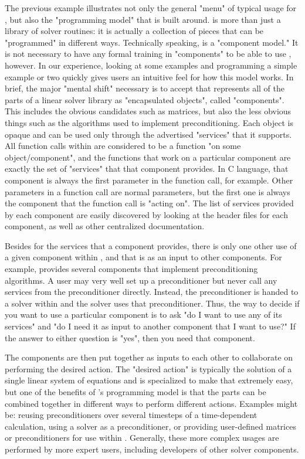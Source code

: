 The previous example illustrates not only the general "menu" of typical usage
for \hypre{}, but also the 
"programming model" that \hypre{} is built around. \hypre{} is more than just a
library of solver routines: it 
is actually a collection of pieces that can be "programmed" in different ways.
Technically speaking, 
\hypre{} is a "component model." It is not necessary to have any formal training
in "components" to be able 
to use \hypre{}, however. In our experience, looking at some examples and
programming a simple example 
or two quickly gives users an intuitive feel for how this model works. In
brief, the major "mental shift" 
necessary is to accept that \hypre{} represents all of the parts of a linear
solver library as "encapsulated 
objects", called "components". This includes the obvious candidates such as
matrices, but also the less 
obvious things such as the algorithms used to implement preconditioning. Each
object is opaque and can be 
used only through the advertised "services" that it supports. All function
calls within \hypre{} are 
considered to be a function "on some object/component", and the functions that
work on a particular 
component are exactly the set of "services" that that component provides. In C
language, that component is 
always the first parameter in the function call, for example. Other parameters
in a function call are normal 
parameters, but the first one is always the component that the function call is
"acting on". The list of 
services provided by each component are easily discovered by looking at the
header files for each 
component, as well as other centralized documentation. 

Besides for the services that a component provides, there is only one other use
of a given component within 
\hypre{}, and that is as an input to other components. For example, \hypre{} provides
several components 
that implement preconditioning algorithms. A user may very well set up a
preconditioner but never call any 
services from the preconditioner directly. Instead, the preconditioner is
handed to a solver within \hypre{} 
and the solver uses that preconditioner. Thus, the way to decide if you want to
use a particular component 
is to ask "do I want to use any of its services" and "do I need it as input to
another component that I want to 
use?" If the answer to either question is "yes", then you need that component.

The components are then put together as inputs to each other to collaborate on
performing the desired 
action. The "desired action" is typically the solution of a single linear
system of equations and \hypre{} is 
specialized to make that extremely easy, but one of the benefits of \hypre{}'s
programming model is that 
the parts can be combined together in different ways to perform different
actions. Examples might be: 
reusing preconditioners over several timesteps of a time-dependent calculation,
using a solver as a 
preconditioner, or providing user-defined matrices or preconditioners for use
within \hypre{}. Generally, 
these more complex usages are performed by more expert users, including
developers of other solver 
components.

